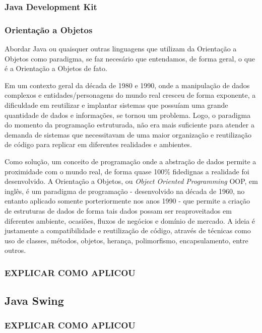 \documentclass[a4paper,12pt]{article}
\begin{document}
\subsubsection{Java Development Kit}



\subsubsection{Orientação a Objetos}
Abordar Java ou quaisquer outras linguagens que utilizam da Orientação a Objetos como paradigma, se faz necesário que entendamos, de forma geral,
o que é a Orientação a Objetos de fato.

Em um contexto geral da década de 1980 e 1990, onde a manipulação de dados complexos e entidades/personagens do mundo real cresceu de forma exponente,
a dificuldade em reutilizar e implantar sistemas que possuíam uma grande quantidade de dados e informações, se tornou um problema. Logo, o paradigma do momento 
da programação estruturada, não era mais suficiente para atender a demanda de sistemas que necessitavam de uma maior organização e reutilização de código 
para replicar em diferentes realidades e ambientes. 

Como solução, um conceito de programação onde a abstração de dados permite a proximidade com o mundo real, de forma quase 100\% fidedignas a realidade foi desenvolvido.
A Orientação a Objetos, ou \textit{Object Oriented Programming} OOP, em inglês, é um paradigma de programação - desenvolvido na década de 1960, no entanto aplicado somente
porteriormente nos anos 1990 - que permite a criação de estruturas de dados de forma tais dados possam ser reaproveitados em diferentes 
ambiente, ocasiões, fluxos de negócios e domínio de mercado. A ideia é justamente a compatibilidade e reutilização de código,
através de técnicas como uso de classes, métodos, objetos, herança, polimorfismo, encapsulamento, entre outros.

\subsubsection{EXPLICAR COMO APLICOU}

\subsection{Java Swing}

\subsubsection{EXPLICAR COMO APLICOU}
\end{document}
